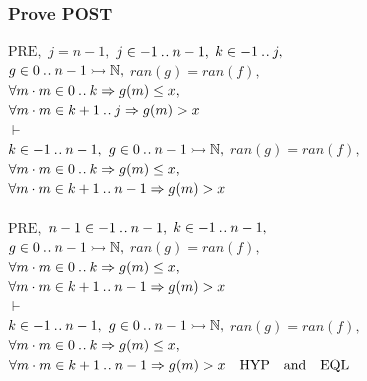 \documentclass[11pt,a4paper,fleqn]{article}
\begin{document}
\subsubsection{Prove POST}
\noindent
$ \text{PRE},$
$j=n-1,$
$j\in -1\mathbin{.\mkern1mu.} n-1,$
$k\in -1\mathbin{.\mkern1mu.} j,$\\
$g\in 0\mathbin{.\mkern1mu.} n-1\rightarrowtail\mathbb{N},$
$ran(g)=ran(f),$\\
$ \forall m \cdot m \in 0 \mathbin{.\mkern1mu.} k \Rightarrow g(m) \leq x ,$\\
$ \forall m \cdot m \in k+1 \mathbin{.\mkern1mu.} j \Rightarrow g(m)>x$\\
$\vdash$\\
$k\in -1\mathbin{.\mkern1mu.} n-1,$
$g\in 0\mathbin{.\mkern1mu.} n-1\rightarrowtail\mathbb{N},$
$ran(g)=ran(f),$\\
$ \forall m \cdot m \in 0 \mathbin{.\mkern1mu.} k \Rightarrow g(m) \leq x ,$\\
$ \forall m \cdot m \in k+1 \mathbin{.\mkern1mu.} n-1 \Rightarrow g(m)>x$\\
\\
$\text{PRE},$
$n-1\in -1\mathbin{.\mkern1mu.} n-1,$
$k\in -1\mathbin{.\mkern1mu.} n-1,$\\
$g\in 0\mathbin{.\mkern1mu.} n-1\rightarrowtail\mathbb{N},$
$ran(g)=ran(f),$\\
$ \forall m \cdot m \in 0 \mathbin{.\mkern1mu.} k \Rightarrow g(m) \leq x ,$\\
$ \forall m \cdot m \in k+1 \mathbin{.\mkern1mu.} n-1 \Rightarrow g(m)>x$\\
$\vdash$\\
$k\in -1\mathbin{.\mkern1mu.} n-1,$
$g\in 0\mathbin{.\mkern1mu.} n-1\rightarrowtail\mathbb{N},$
$ran(g)=ran(f),$\\
$ \forall m \cdot m \in 0 \mathbin{.\mkern1mu.} k \Rightarrow g(m) \leq x ,$\\
$ \forall m \cdot m \in k+1 \mathbin{.\mkern1mu.} n-1 \Rightarrow g(m)>x\quad \text{HYP\quad and\quad EQL}$\\
\end{document}
